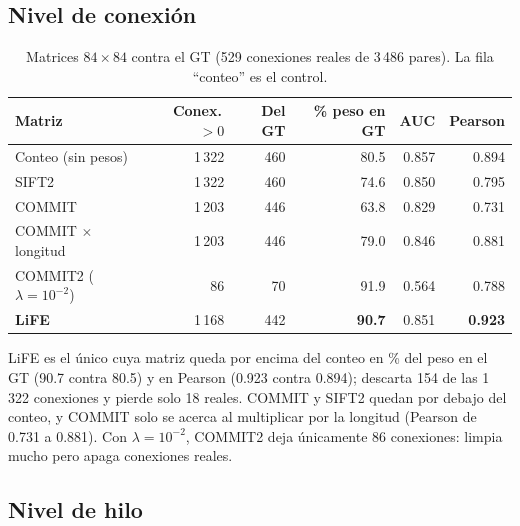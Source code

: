 \documentclass[11pt,a4paper]{article}
\begin{document}
\subsection{Nivel de conexi\'on}

\begin{table}[H]
\centering
\small
\begin{tabularx}{\textwidth}{@{}Xrrrrr@{}}
\toprule
\textbf{Matriz} & \textbf{Conex.\,$>0$} & \textbf{Del GT} & \textbf{\% peso en GT} & \textbf{AUC} & \textbf{Pearson}\\
\midrule
Conteo (sin pesos)         & 1\,322 & 460 & 80.5 & 0.857 & 0.894\\
SIFT2                      & 1\,322 & 460 & 74.6 & 0.850 & 0.795\\
COMMIT                     & 1\,203 & 446 & 63.8 & 0.829 & 0.731\\
COMMIT $\times$ longitud   & 1\,203 & 446 & 79.0 & 0.846 & 0.881\\
COMMIT2 ($\lambda=10^{-2}$)& 86     & 70  & 91.9 & 0.564 & 0.788\\
\textbf{LiFE}              & 1\,168 & 442 & \textbf{90.7} & 0.851 & \textbf{0.923}\\
\bottomrule
\end{tabularx}
\caption{Matrices $84\times84$ contra el GT (529 conexiones reales de 3\,486 pares). La
fila ``conteo'' es el control.}
\label{tab:matrices}
\end{table}

LiFE es el \'unico cuya matriz queda por encima del conteo en \% del peso en el GT (90.7
contra 80.5) y en Pearson (0.923 contra 0.894); descarta 154 de las 1\,322 conexiones y
pierde solo 18 reales. COMMIT y SIFT2 quedan por debajo del conteo, y COMMIT solo se
acerca al multiplicar por la longitud (Pearson de 0.731 a 0.881). Con $\lambda=10^{-2}$,
COMMIT2 deja \'unicamente 86 conexiones: limpia mucho pero apaga conexiones reales.

\subsection{Nivel de hilo}
\label{sec:res-hilo}
\end{document}
